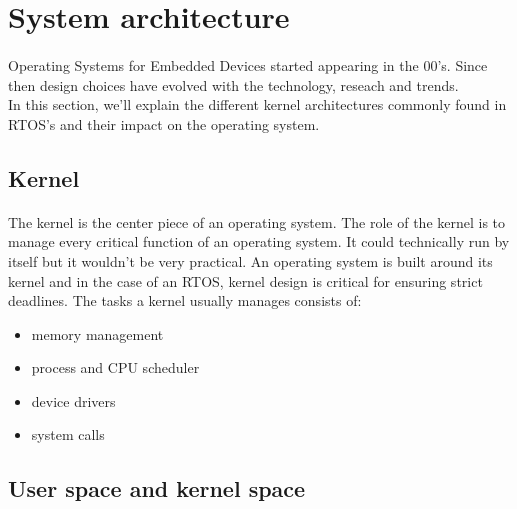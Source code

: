 \section{System architecture}

\paragraph{}
Operating Systems for Embedded Devices started appearing in the 00's.
Since then design choices have evolved with the technology, reseach and trends.
\\
In this section, we'll explain the different kernel architectures commonly found in RTOS's and their impact on the operating system.



\subsection{Kernel}
\paragraph{}
The kernel is the center piece of an operating system.
The role of the kernel is to manage every critical function of an operating system.
It could technically run by itself but it wouldn't be very practical.
An operating system is built around its kernel and in the case of an RTOS, kernel design is critical for ensuring strict deadlines.
The tasks a kernel usually manages consists of:
\begin{itemize}
    \item memory management
    \item process and CPU scheduler
    \item device drivers
    \item system calls
\end{itemize}


\subsection{User space and kernel space}
